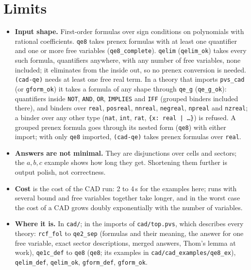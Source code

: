 \documentclass[11pt]{article}
\begin{document}
\section{Limits}
\begin{itemize}[leftmargin=1.3em, itemsep=3pt]
\item \textbf{Input shape.} First-order formulas over sign conditions on polynomials with rational coefficients.
\texttt{qe8} takes prenex formulas with at least one quantifier and one or more free variables
(\texttt{qe8\_complete}). \texttt{qelim} (\texttt{qelim\_ok}) takes every such formula,
quantifiers anywhere, with any number of free variables, none included; it eliminates from the inside out, so no
prenex conversion is needed. \texttt{(cad-qe)} needs at least one free real term. In a theory that imports
\texttt{pvs\_cad} (or \texttt{gform\_ok}) it takes a formula of any shape through \texttt{qe\_g}
(\texttt{qe\_g\_ok}): quantifiers inside \texttt{NOT}, \texttt{AND}, \texttt{OR},
\texttt{IMPLIES} and \texttt{IFF} (grouped binders included there), and binders over \texttt{real}, \texttt{posreal}, \texttt{nnreal},
\texttt{negreal}, \texttt{npreal} and \texttt{nzreal}; a binder over any other type (\texttt{nat}, \texttt{int},
\texttt{rat}, \texttt{\{x: real | \dots\}}) is refused. A grouped prenex formula goes through its nested form
(\texttt{qe8}) with either import; with only \texttt{qe8} imported, \texttt{(cad-qe)} takes
prenex formulas over \texttt{real}.
\item \textbf{Answers are not minimal.} They are disjunctions over cells and sectors; the $a,b,c$ example
shows how long they get. Shortening them further is output polish, not correctness.
\item \textbf{Cost} is the cost of the CAD run: 2 to 4\,s for the examples here; runs with
several bound and free variables together take longer, and in the worst case the cost of a CAD grows doubly
exponentially with the number of variables.
\item \textbf{Where it is.} In \texttt{cad/}; in the imports of \texttt{cad/top.pvs}, which describes every
theory: \texttt{rcf\_fol} to \texttt{qe2\_sep} (formulas and their meaning, the answer for one free variable,
exact sector descriptions, merged answers, Thom's lemma at work), \texttt{qe1c\_def} to \texttt{qe8}
(\texttt{qe8}; its examples in \texttt{cad/cad\_examples/qe8\_ex}), \texttt{qelim\_def}, \texttt{qelim\_ok}, \texttt{gform\_def}, \texttt{gform\_ok}.
\end{itemize}
\end{document}
